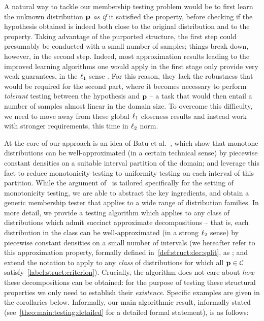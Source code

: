  A natural way to tackle our membership testing problem would be to first learn the unknown distribution $\D$ \emph{as if} it satisfied the property, before checking if the hypothesis obtained is indeed both close to the original distribution and to the property. Taking advantage of the purported structure, the first step could presumably be conducted with a small number of samples; things break down, however, in the second step. 
Indeed, most approximation results leading to the improved learning algorithms one would apply in the first stage only provide very weak guarantees,  in the $\lp[1]$ sense . For this reason, they lack the robustness that would be required for the second part, where it becomes necessary to perform \emph{tolerant} testing between the hypothesis and $\D$ -- a task that would then entail a number of samples almost linear in the domain size. To overcome this difficulty, we need to move away from these global $\lp[1]$ closeness results and instead work with stronger requirements, this time in $\lp[2]$ norm. 

At the core of our approach is an idea of Batu et al.~\cite{BKR:04}, which show that monotone distributions can be well-approximated (in a certain technical sense) 
by piecewise constant densities on a suitable interval partition of the domain; and leverage this fact to reduce monotonicity testing to uniformity testing on each interval of this partition. 
While the argument of~\cite{BKR:04} is tailored specifically for the setting of monotonicity testing, we are able to abstract the key ingredients, and obtain a generic membership tester that applies to a wide range of distribution families. In more detail, we provide a testing algorithm which applies to any class of distributions which admit succinct approximate decompositions -- that is, each distribution in the class can be well-approximated (in a strong $\lp[2]$ sense) by piecewise constant densities on a small number of intervals (we hereafter refer to this approximation property, formally defined in~\cref{def:struct:dec:split}, as ; and extend the notation to apply to any \emph{class} \class of distributions for which all $\D\in\class$ satisfy~\eqref{label:struct:criterion}). 
Crucially, the algorithm does not care about \emph{how} these decompositions can be obtained: 
for the purpose of testing these structural properties we only need to establish their \emph{existence}. Specific examples are given in the corollaries below.
Informally, our main algorithmic result, informally stated (see~\cref{theo:main:testing:detailed} for a detailed formal statement), is as follows:

